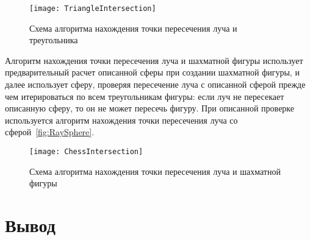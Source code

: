 \begin{figure}[H]
	\centering
	\texttt{[image: TriangleIntersection]}
	\caption{Схема алгоритма нахождения точки пересечения луча и треугольника}
	\label{fig:TriangleIntersection}
\end{figure}

Алгоритм нахождения точки пересечения луча и шахматной фигуры использует предварительный расчет описанной сферы при создании шахматной фигуры, и далее использует сферу, проверяя пересечение луча с описанной сферой прежде чем итерироваться по всем треугольникам фигуры: если луч не пересекает описанную сферу, то он не может пересечь фигуру. При описанной проверке используется алгоритм нахождения точки пересечения луча со сферой~\ref{fig:RaySphere}.

\begin{figure}[H]
	\centering
	\texttt{[image: ChessIntersection]}
	\caption{Схема алгоритма нахождения точки пересечения луча и шахматной фигуры}
	\label{fig:ChessIntersection}
\end{figure}

\section{Вывод}


\clearpage
